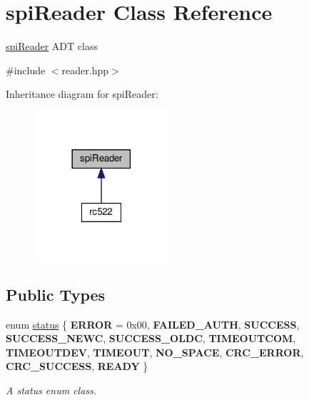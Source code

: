 \hypertarget{classspiReader}{}\section{spi\+Reader Class Reference}
\label{classspiReader}


\hyperlink{classspiReader}{spi\+Reader} A\+DT class  




{\ttfamily \#include $<$reader.\+hpp$>$}



Inheritance diagram for spi\+Reader\+:
\nopagebreak
\begin{figure}[H]
\begin{center}
\leavevmode
\includegraphics[width=141pt]{classspiReader__inherit__graph}
\end{center}
\end{figure}
\subsection*{Public Types}
\begin{DoxyCompactItemize}
\item 
enum \hyperlink{classspiReader_a4bcf984823c38cf4841ebf619e788790}{status} \{ \newline
{\bfseries E\+R\+R\+OR} = 0x00, 
{\bfseries F\+A\+I\+L\+E\+D\+\_\+\+A\+U\+TH}, 
{\bfseries S\+U\+C\+C\+E\+SS}, 
{\bfseries S\+U\+C\+C\+E\+S\+S\+\_\+\+N\+E\+WC}, 
\newline
{\bfseries S\+U\+C\+C\+E\+S\+S\+\_\+\+O\+L\+DC}, 
{\bfseries T\+I\+M\+E\+O\+U\+T\+C\+OM}, 
{\bfseries T\+I\+M\+E\+O\+U\+T\+D\+EV}, 
{\bfseries T\+I\+M\+E\+O\+UT}, 
\newline
{\bfseries N\+O\+\_\+\+S\+P\+A\+CE}, 
{\bfseries C\+R\+C\+\_\+\+E\+R\+R\+OR}, 
{\bfseries C\+R\+C\+\_\+\+S\+U\+C\+C\+E\+SS}, 
{\bfseries R\+E\+A\+DY}
 \}\begin{DoxyCompactList}\small\item\em A status enum class. \end{DoxyCompactList}
\end{DoxyCompactItemize}
